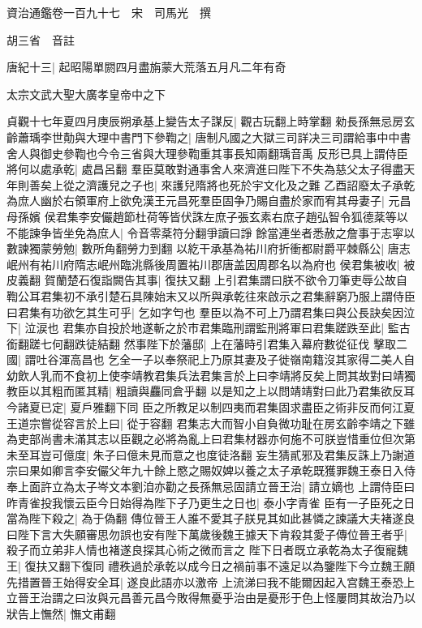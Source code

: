 資治通鑑卷一百九十七　宋　司馬光　撰

胡三省　音註

唐紀十三|{
	起昭陽單閼四月盡旃蒙大荒落五月凡二年有奇}


太宗文武大聖大廣孝皇帝中之下

貞觀十七年夏四月庚辰朔承基上變告太子謀反|{
	觀古玩翻上時掌翻}
勑長孫無忌房玄齡蕭瑀李世勣與大理中書門下參鞫之|{
	唐制凡國之大獄三司詳决三司謂給事中中書舍人與御史參鞫也今令三省與大理參鞫重其事長知兩翻瑀音禹}
反形已具上謂侍臣將何以處承乾|{
	處昌呂翻}
羣臣莫敢對通事舍人來濟進曰陛下不失為慈父太子得盡天年則善矣上從之濟護兒之子也|{
	來護兒隋將也死於宇文化及之難}
乙酉詔廢太子承乾為庶人幽於右領軍府上欲免漢王元昌死羣臣固争乃賜自盡於家而宥其母妻子|{
	元昌母孫嬪}
侯君集李安儼趙節杜荷等皆伏誅左庶子張玄素右庶子趙弘智令狐德棻等以不能諫争皆坐免為庶人|{
	令音零棻符分翻爭讀曰諍}
餘當連坐者悉赦之詹事于志寜以數諫獨蒙勞勉|{
	數所角翻勞力到翻}
以紇干承基為祐川府折衝都尉爵平棘縣公|{
	唐志岷州有祐川府隋志岷州臨洮縣後周置祐川郡唐盖因周郡名以為府也}
侯君集被收|{
	被皮義翻}
賀蘭楚石復詣闕告其事|{
	復扶又翻}
上引君集謂曰朕不欲令刀筆吏辱公故自鞫公耳君集初不承引楚石具陳始末又以所與承乾往來啟示之君集辭窮乃服上謂侍臣曰君集有功欲乞其生可乎|{
	乞如字匄也}
羣臣以為不可上乃謂君集曰與公長訣矣因泣下|{
	泣涙也}
君集亦自投於地遂斬之於市君集臨刑謂監刑將軍曰君集蹉跌至此|{
	監古銜翻蹉七何翻跌徒結翻}
然事陛下於藩邸|{
	上在藩時引君集入幕府數從征伐}
擊取二國|{
	謂吐谷渾高昌也}
乞全一子以奉祭祀上乃原其妻及子徙嶺南籍沒其家得二美人自幼飲人乳而不食初上使李靖教君集兵法君集言於上曰李靖將反矣上問其故對曰靖獨教臣以其粗而匿其精|{
	粗讀與麤同倉乎翻}
以是知之上以問靖靖對曰此乃君集欲反耳今諸夏已定|{
	夏戶雅翻下同}
臣之所教足以制四夷而君集固求盡臣之術非反而何江夏王道宗嘗從容言於上曰|{
	從于容翻}
君集志大而智小自負微功耻在房玄齡李靖之下雖為吏部尚書未滿其志以臣觀之必將為亂上曰君集材器亦何施不可朕豈惜重位但次第未至耳豈可億度|{
	朱子曰億未見而意之也度徒洛翻}
妄生猜貳邪及君集反誅上乃謝道宗曰果如卿言李安儼父年九十餘上愍之賜奴婢以養之太子承乾既獲罪魏王泰日入侍奉上面許立為太子岑文本劉洎亦勸之長孫無忌固請立晉王治|{
	請立嫡也}
上謂侍臣曰昨青雀投我懷云臣今日始得為陛下子乃更生之日也|{
	泰小字青雀}
臣有一子臣死之日當為陛下殺之|{
	為于偽翻}
傳位晉王人誰不愛其子朕見其如此甚憐之諫議大夫褚遂良曰陛下言大失願審思勿誤也安有陛下萬歲後魏王據天下肯殺其愛子傳位晉王者乎|{
	殺子而立弟非人情也褚遂良探其心術之微而言之}
陛下日者既立承乾為太子復寵魏王|{
	復扶又翻下復同}
禮秩過於承乾以成今日之禍前事不遠足以為鑒陛下今立魏王願先措置晉王始得安全耳|{
	遂良此語亦以激帝}
上流涕曰我不能爾因起入宫魏王泰恐上立晉王治謂之曰汝與元昌善元昌今敗得無憂乎治由是憂形于色上怪屢問其故治乃以狀告上憮然|{
	憮文甫翻}
